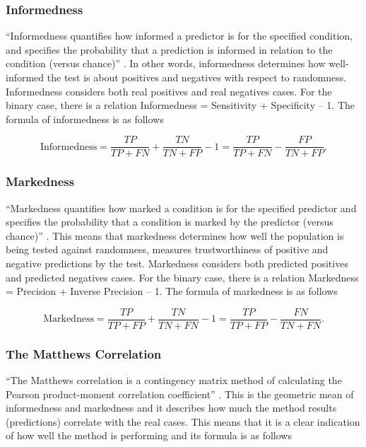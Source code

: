 \documentclass[english]{pwr_wmat_praca_dyplomowa}
\theoremstyle{plain}
\theoremstyle{definition}
\numberwithin{theorem}{chapter}
\begin{document}
\subsubsection{Informedness}

``Informedness quantifies how informed a predictor is for the specified condition, and specifies the probability that a prediction is informed in relation to the condition (versus chance)'' \cite{powers2011evaluation}. In other words, informedness determines how well-informed the test is about positives and negatives with respect to randomness. Informedness considers both real positives and real negatives cases. For the binary case, there is a relation Informedness = Sensitivity + Specificity – 1. The formula of informedness is as follows

$$ \text{Informedness} = \frac{TP}{TP + FN}  +  \frac{TN}{TN + FP} - 1 = \frac{TP}{TP + FN} - \frac{FP}{TN + FP}. $$
	
\subsubsection{Markedness}

``Markedness quantifies how marked a condition is for the specified predictor and specifies the probability that a condition is marked by the predictor (versus chance)'' \cite{powers2011evaluation}. This means that markedness determines how well the population is being tested against randomness, measures trustworthiness of positive and negative predictions by the test. Markedness considers both predicted positives and predicted negatives cases. For the binary case, there is a relation Markedness = Precision + Inverse Precision – 1. The formula of markedness is as follows

$$ \text{Markedness} = \frac{TP}{TP + FP} + \frac{TN}{TN + FN} - 1 = \frac{TP}{TP + FP} - \frac{FN}{TN + FN}. $$

\subsubsection{The Matthews Correlation}

``The Matthews correlation is a contingency matrix method of calculating the Pearson product-moment correlation coefficient'' \cite{powers2011evaluation}. This is the geometric mean of informedness and markedness and it describes how much the method results (predictions) correlate with the real cases. This means that it is a clear indication of how well the method is performing and its formula is as follows
\end{document}
